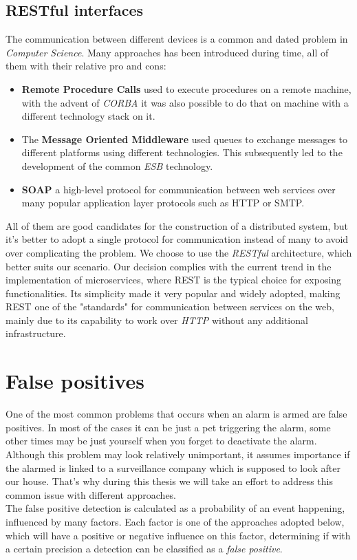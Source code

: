 \subsection{RESTful interfaces}
The communication between different devices is a common and dated
problem in \textit{Computer Science}. Many approaches has been introduced
during time, all of them with their relative pro and cons:

\begin{itemize}
  \item \textbf{Remote Procedure Calls} used to execute procedures on a remote machine,
  with the advent of \textit{CORBA} it was also possible to do that on machine
  with a different technology stack on it.
  \item The \textbf{Message Oriented Middleware} used queues to exchange messages to
  different platforms using different technologies. This subsequently led to
  the development of the common \textit{ESB} technology.
  \item \textbf{SOAP} a high-level protocol for communication between web services
  over many popular application layer protocols such as HTTP or SMTP.
\end{itemize}

All of them are good candidates for the construction of a distributed system,
but it's better to adopt a single protocol for communication instead of many to
avoid over complicating the problem.
We choose to use the \textit{RESTful} architecture, which
better suits our scenario. Our decision complies with the current trend in the
implementation of microservices, where REST is the typical choice for exposing
functionalities. Its simplicity made it very popular and widely adopted, making
REST one of the "standards" for communication between services on the web, mainly
due to its capability to work over \textit{HTTP} without any additional infrastructure.



\section{False positives}

One of the most common problems that occurs when an alarm
is armed are false positives. In most of the cases it can be just a pet
triggering the alarm, some other times may be just yourself when you forget to
deactivate the alarm.\\
Although this problem may look relatively unimportant, it assumes importance if the
alarmed is linked to a surveillance company which is supposed to look after our house.
That's why during this thesis we will take an effort to address this common issue with different
approaches.\\
The false positive detection is calculated as a probability of an event happening, influenced
by many factors. Each factor is one of the approaches adopted below, which will have a positive or
negative influence on this factor, determining if with a certain precision a detection can be classified
as a \textit{false positive}.


